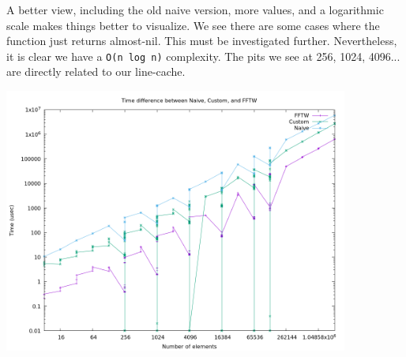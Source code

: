 \documentclass{../../../myassignment}
\begin{document}
	A better view, including the old naive version, more values, and a logarithmic scale makes things better to visualize. We see there are some cases where the function just returns almost-nil. This must be investigated further. Nevertheless, it is clear we have a \texttt{O(n log n)} complexity. The pits we see at 256, 1024, 4096... are directly related to our line-cache.

	\includegraphics[width=0.85\textwidth]{img/better.png}
\end{document}
